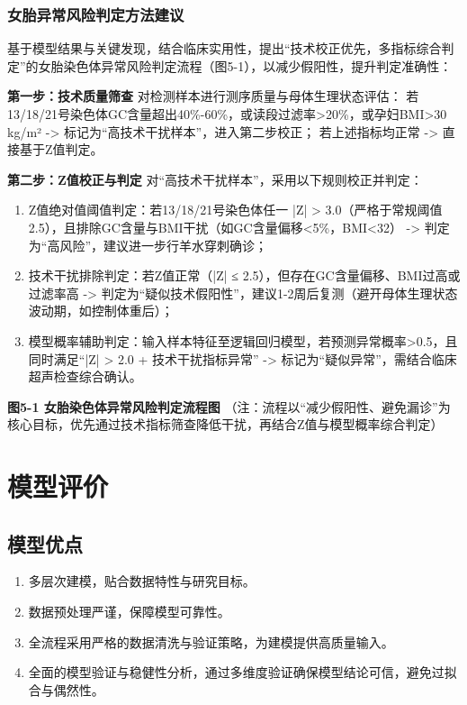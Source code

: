 \documentclass[withoutpreface,bwprint]{cumcmthesis} %
\begin{document}
\subsubsection{女胎异常风险判定方法建议}
基于模型结果与关键发现，结合临床实用性，提出“技术校正优先，多指标综合判定”的女胎染色体异常风险判定流程（图5-1），以减少假阳性，提升判定准确性：

\textbf{第一步：技术质量筛查}
对检测样本进行测序质量与母体生理状态评估：  
若13/18/21号染色体GC含量超出40\%-60\%，或读段过滤率>20\%，或孕妇BMI>30 kg/m² -> 标记为“高技术干扰样本”，进入第二步校正；  
若上述指标均正常 -> 直接基于Z值判定。

\textbf{第二步：Z值校正与判定}
对“高技术干扰样本”，采用以下规则校正并判定：
\begin{enumerate}
    \item Z值绝对值阈值判定：若13/18/21号染色体任一 |Z| > 3.0（严格于常规阈值2.5），且排除GC含量与BMI干扰（如GC含量偏移<5\%，BMI<32） -> 判定为“高风险”，建议进一步行羊水穿刺确诊；
    \item 技术干扰排除判定：若Z值正常（|Z| ≤ 2.5），但存在GC含量偏移、BMI过高或过滤率高 -> 判定为“疑似技术假阳性”，建议1-2周后复测（避开母体生理状态波动期，如控制体重后）；
    \item 模型概率辅助判定：输入样本特征至逻辑回归模型，若预测异常概率>0.5，且同时满足“|Z| > 2.0 + 技术干扰指标异常” -> 标记为“疑似异常”，需结合临床超声检查综合确认。
\end{enumerate}

\textbf{图5-1 女胎染色体异常风险判定流程图}
（注：流程以“减少假阳性、避免漏诊”为核心目标，优先通过技术指标筛查降低干扰，再结合Z值与模型概率综合判定）


\section{模型评价}
\subsection{模型优点}

\begin{enumerate}
    \item 多层次建模，贴合数据特性与研究目标。
    \item 数据预处理严谨，保障模型可靠性。
    \item 全流程采用严格的数据清洗与验证策略，为建模提供高质量输入。
    \item 全面的模型验证与稳健性分析，通过多维度验证确保模型结论可信，避免过拟合与偶然性。
\end{enumerate}
\end{document}
